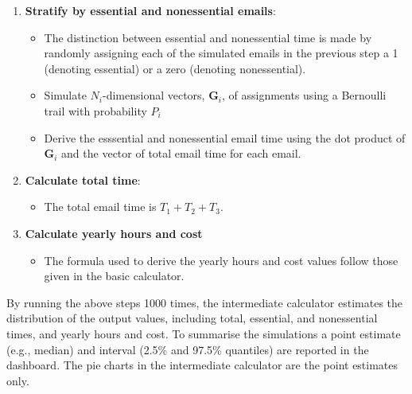 \documentclass[
  reportpaper,
  DIV=11,
  numbers=noendperiod]{scrartcl}
\providecommand{\tightlist}{%
  \setlength{\itemsep}{0pt}\setlength{\parskip}{0pt}}\usepackage{longtable,booktabs,array}
\begin{document}
\begin{enumerate}
\def\labelenumi{\arabic{enumi}.}
\setcounter{enumi}{4}
\tightlist
\item
  \textbf{Stratify by essential and nonessential emails}:

  \begin{itemize}
  \tightlist
  \item
    The distinction between essential and nonessential time is made by
    randomly assigning each of the simulated emails in the previous step
    a 1 (denoting essential) or a zero (denoting nonessential).
  \item
    Simulate \(N_i\)-dimensional vectors, \(\boldsymbol{G}_i\), of
    assignments using a Bernoulli trail with probability \(P_i\)
  \item
    Derive the esssential and nonessential email time using the dot
    product of \(\boldsymbol{G}_i\) and the vector of total email time
    for each email.
  \end{itemize}
\item
  \textbf{Calculate total time}:

  \begin{itemize}
  \tightlist
  \item
    The total email time is \(T_1 + T_2 + T_3\).
  \end{itemize}
\item
  \textbf{Calculate yearly hours and cost}

  \begin{itemize}
  \tightlist
  \item
    The formula used to derive the yearly hours and cost values follow
    those given in the basic calculator.
  \end{itemize}
\end{enumerate}

By running the above steps 1000 times, the intermediate calculator
estimates the distribution of the output values, including total,
essential, and nonessential times, and yearly hours and cost. To
summarise the simulations a point estimate (e.g., median) and interval
(2.5\% and 97.5\% quantiles) are reported in the dashboard. The pie
charts in the intermediate calculator are the point estimates only.
\end{document}
